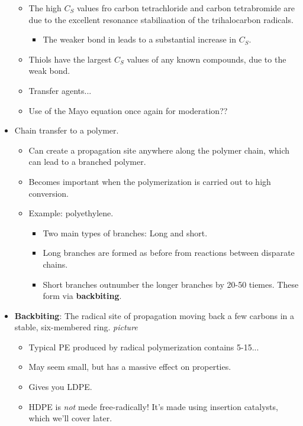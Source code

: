 \documentclass[../notes.tex]{subfiles}
\begin{document}
\begin{itemize}
\begin{itemize}
\begin{itemize}
        \end{itemize}
        \item The high $C_S$ values fro carbon tetrachloride and carbon tetrabromide are due to the excellent resonance stabiliaation of the trihalocarbon radicals.
        \begin{itemize}
            \item The weaker  bond in  leads to a substantial increase in $C_S$.
        \end{itemize}
        \item Thiols have the largest $C_S$ values of any known compounds, due to the weak  bond.
        \item Transfer agents...
        \item Use of the Mayo equation once again for moderation??
    \end{itemize}
    \item Chain transfer to a polymer.
    \begin{itemize}
        \item Can create a propagation site anywhere along the polymer chain, which can lead to a branched polymer.
        \item Becomes important when the polymerization is carried out to high conversion.
        \item Example: polyethylene.
        \begin{itemize}
            \item Two main types of branches: Long and short.
            \item Long branches are formed as before from reactions between disparate chains.
            \item Short branches outnumber the longer branches by 20-50 tiemes. These form via \textbf{backbiting}.
        \end{itemize}
    \end{itemize}
    \item \textbf{Backbiting}: The radical site of propagation moving back a few carbons in a stable, six-membered ring.
    \emph{picture}
    \begin{itemize}
        \item Typical PE produced by radical polymerization contains 5-15...
        \item May seem small, but has a massive effect on properties.
        \item Gives you LDPE.
        \item HDPE is \emph{not} mede free-radically! It's made using insertion catalysts, which we'll cover later.

\end{itemize}
\end{itemize}
\end{document}
